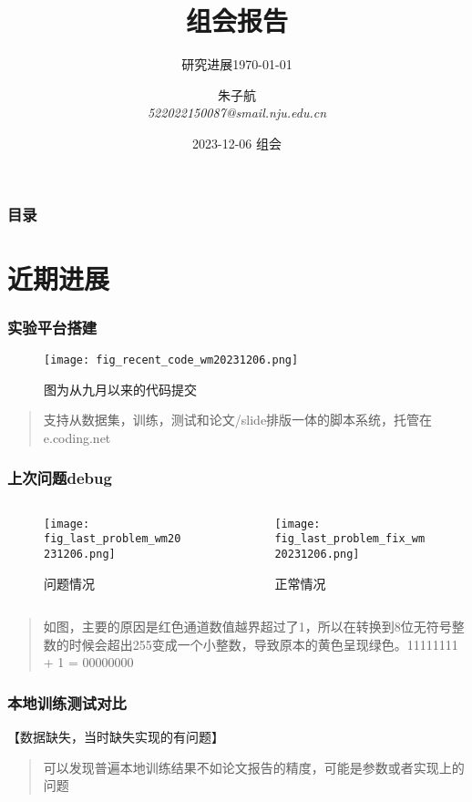\documentclass{njupre/njupre}
\title[组会]{组会报告}
\subtitle{研究进展\today}
\author[朱子航]{\texorpdfstring{朱子航 \\ \smallskip \textit{522022150087@smail.nju.edu.cn}}{}}
\date[2023-12-06]{\texorpdfstring{2023-12-06 组会}{}}
\begin{document}
\begin{frame}
    \titlepage
\end{frame}
\begin{frame}
    \frametitle{目录}
    \tableofcontents
\end{frame}

\section{近期进展}

\begin{frame}
    \frametitle{实验平台搭建}
    \begin{figure}
        \texttt{[image: fig\_recent\_code\_wm20231206.png]}
        \caption{图为从九月以来的代码提交}
    \end{figure}
    \begin{quote}
        支持从数据集，训练，测试和论文/slide排版一体的脚本系统，托管在e.coding.net
    \end{quote}
\end{frame}

\begin{frame}
    \frametitle{上次问题debug}
    \begin{columns}[c]
        \begin{column}{0.5\textwidth}
            \begin{figure}
                \texttt{[image: fig\_last\_problem\_wm20231206.png]}
                \caption{问题情况}
            \end{figure}
        \end{column}
        \begin{column}{0.5\textwidth}
            \begin{figure}
                \texttt{[image: fig\_last\_problem\_fix\_wm20231206.png]}
                \caption{正常情况}
            \end{figure}
        \end{column}
    \end{columns}
    \begin{quote}
        如图，主要的原因是红色通道数值越界超过了1，所以在转换到8位无符号整数的时候会超出255变成一个小整数，导致原本的黄色呈现绿色。11111111 + 1 = 00000000
    \end{quote}
\end{frame}

\begin{frame}
    \frametitle{本地训练测试对比}
    【数据缺失，当时缺失实现的有问题】
    \begin{quote}
        可以发现普遍本地训练结果不如论文报告的精度，可能是参数或者实现上的问题
    \end{quote}
\end{frame}
\end{document}
